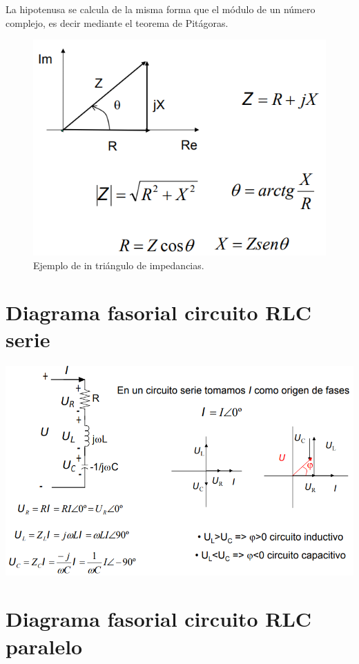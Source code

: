 \documentclass{mylib/reporte}
\begin{document}
La hipotenusa se calcula de la misma forma que el módulo de un número complejo, es decir mediante el teorema de Pitágoras.

\begin{figure}[H]
	\centering
	\includegraphics[scale=0.4	]{img/circ_expo/image3}
	\caption{Ejemplo de in triángulo de impedancias.}
\end{figure}

\section{Diagrama fasorial circuito RLC serie}

\includegraphics[scale=0.5]{img/circ_expo/image2}

\section{Diagrama fasorial circuito RLC paralelo}
\end{document}
